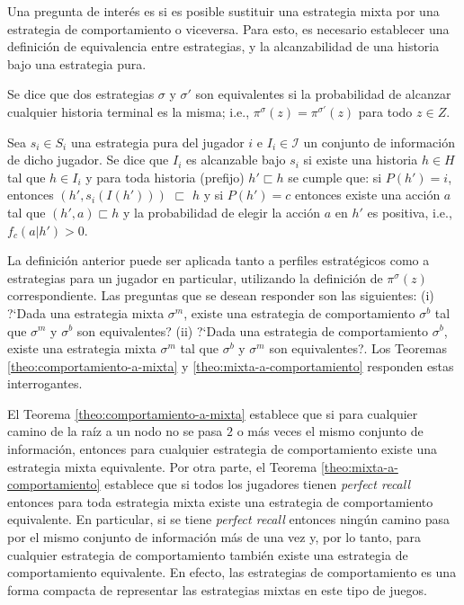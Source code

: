 Una pregunta de interés es si es posible sustituir una estrategia mixta por una estrategia de comportamiento o viceversa. Para esto, es necesario establecer una definición de equivalencia entre estrategias, y la alcanzabilidad de una historia bajo una estrategia pura.

\begin{definition}
\label{def:equivalencia-estrategias}
Se dice que dos estrategias $\sigma$ y $\sigma'$ son equivalentes si la probabilidad de alcanzar cualquier historia terminal es la misma; i.e., $\pi^\sigma(z) = \pi^{\sigma'}(z)$ para todo $z \in Z$.
\end{definition}

\begin{definition}
\label{def:alcanzabilidad-historia}
Sea $s_i \in S_i$ una estrategia pura del jugador $i$ e $I_i \in \mathcal{I}$ un conjunto de información de dicho jugador. Se dice que $I_i$ es alcanzable bajo $s_i$ si existe una historia $h \in H$ tal que $h \in I_i$ y para toda historia (prefijo) $h' \sqsubset h$ se cumple que: si $P(h') = i$, entonces $(h', s_i(I(h')))$ $\sqsubset$ $h$ y si $P(h') = c$ entonces existe una acción $a$ tal que $(h', a) \sqsubset h$ y la probabilidad de elegir la acción $a$ en $h'$ es positiva, i.e., $f_c(a|h') > 0$. 
\end{definition}

La definición anterior puede ser aplicada tanto a perfiles estratégicos como a estrategias para un jugador en particular, utilizando la definición de $\pi^\sigma(z)$ correspondiente. Las preguntas que se desean responder son las siguientes: (i) ?`Dada una estrategia mixta $\sigma^m$, existe una estrategia de comportamiento $\sigma^b$ tal que $\sigma^m$ y $\sigma^b$ son equivalentes? (ii) ?`Dada una estrategia de comportamiento $\sigma^b$, existe una estrategia mixta $\sigma^m$ tal que $\sigma^b$ y $\sigma^m$ son equivalentes?. Los Teoremas \ref{theo:comportamiento-a-mixta} y \ref{theo:mixta-a-comportamiento} responden estas interrogantes.

El Teorema \ref{theo:comportamiento-a-mixta} establece que si para cualquier camino de la raíz a un nodo no se pasa $2$ o más veces el mismo conjunto de información, entonces para cualquier estrategia de comportamiento existe una estrategia mixta equivalente. Por otra parte, el Teorema \ref{theo:mixta-a-comportamiento} establece que si todos los jugadores tienen \textit{perfect recall} entonces para toda estrategia mixta existe una estrategia de comportamiento equivalente. En particular, si se tiene \textit{perfect recall} entonces ningún camino pasa por el mismo conjunto de información más de una vez y, por lo tanto, para cualquier estrategia de comportamiento también existe una estrategia de comportamiento equivalente. En efecto, las estrategias de comportamiento es una forma compacta de representar las estrategias mixtas en este tipo de juegos.

